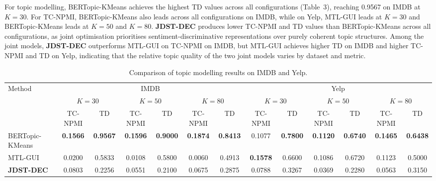 {%
For topic modelling, BERTopic-KMeans achieves the highest TD values across
all configurations (Table~3), reaching 0.9567 on IMDB at $K = 30$. For
TC-NPMI, BERTopic-KMeans also leads across all configurations on IMDB,
while on Yelp, MTL-GUI leads at $K = 30$ and BERTopic-KMeans leads at
$K = 50$ and $K = 80$. \textbf{JDST-DEC} produces lower TC-NPMI and TD
values than BERTopic-KMeans across all configurations, as joint
optimisation prioritises sentiment-discriminative representations over
purely coherent topic structures. Among the joint models, \textbf{JDST-DEC}
outperforms MTL-GUI on TC-NPMI on IMDB, but MTL-GUI achieves higher TD on
IMDB and higher TC-NPMI and TD on Yelp, indicating that the relative
topic quality of the two joint models varies by dataset and metric.

\begin{table}[H]
\centering
\caption{Comparison of topic modelling results on IMDB and Yelp.}
\label{tab:ea_topic}
\small
\renewcommand{\arraystretch}{1.55}
\setlength{\tabcolsep}{6pt}
\begin{adjustbox}{width=\textwidth}
\begin{tabular}{|l|cc|cc|cc|cc|cc|cc|}
\hline
\multirow{3}{*}{Method}
  & \multicolumn{6}{c|}{IMDB}
  & \multicolumn{6}{c|}{Yelp} \\
\cline{2-13}
  & \multicolumn{2}{c|}{$K=30$}
  & \multicolumn{2}{c|}{$K=50$}
  & \multicolumn{2}{c|}{$K=80$}
  & \multicolumn{2}{c|}{$K=30$}
  & \multicolumn{2}{c|}{$K=50$}
  & \multicolumn{2}{c|}{$K=80$} \\
\cline{2-13}
  & TC-NPMI & TD
  & TC-NPMI & TD
  & TC-NPMI & TD
  & TC-NPMI & TD
  & TC-NPMI & TD
  & TC-NPMI & TD \\
\hline
BERTopic-KMeans
  & \cellcolor{green!25}\textbf{0.1566} & \cellcolor{green!25}\textbf{0.9567}
  & \cellcolor{green!25}\textbf{0.1596} & \cellcolor{green!25}\textbf{0.9000}
  & \cellcolor{green!25}\textbf{0.1874} & \cellcolor{green!25}\textbf{0.8413}
  & 0.1077 & \cellcolor{green!25}\textbf{0.7800}
  & \cellcolor{green!25}\textbf{0.1120} & \cellcolor{green!25}\textbf{0.6740}
  & \cellcolor{green!25}\textbf{0.1465} & \cellcolor{green!25}\textbf{0.6438} \\
\hline
MTL-GUI
  & 0.0200 & 0.5833
  & 0.0108 & 0.5800
  & 0.0060 & 0.4913
  & \cellcolor{green!25}\textbf{0.1578} & 0.6600
  & 0.1086 & 0.6720
  & 0.1123 & 0.5000 \\
\hline
\textbf{JDST-DEC}
  & 0.0803 & 0.2256
  & 0.0551 & 0.2100
  & 0.0675 & 0.2875
  & 0.0788 & 0.3267
  & 0.0369 & 0.2280
  & 0.0563 & 0.3150 \\
\hline
\end{tabular}
\end{adjustbox}
\vspace{0.3em}
\end{table}

}
